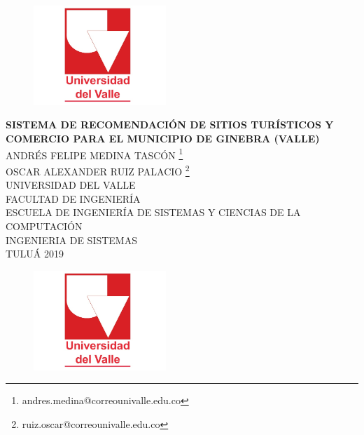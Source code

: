 \documentclass[12pt,letterpaper,openany]{book}
\date{}
\begin{document}
\fancyhead[RO,LE]{}

\begin{titlepage}

\begin{center}

\begin{figure}[htb]
\begin{center}
\includegraphics[width=5cm]{./imagenes/logo}
\end{center}
\end{figure}

\textbf{SISTEMA DE RECOMENDACIÓN DE SITIOS TURÍSTICOS Y COMERCIO PARA EL MUNICIPIO DE GINEBRA (VALLE)} \\

\vspace*{1.5in}
ANDRÉS FELIPE MEDINA TASCÓN \footnote{andres.medina@correounivalle.edu.co}\\
OSCAR ALEXANDER RUIZ PALACIO \footnote{ruiz.oscar@correounivalle.edu.co}\\

\vspace*{1.5in}
UNIVERSIDAD DEL VALLE\\
FACULTAD DE INGENIERÍA\\
ESCUELA DE INGENIERÍA DE SISTEMAS Y CIENCIAS DE LA COMPUTACIÓN\\
INGENIERIA DE SISTEMAS\\
TULUÁ
2019

\end{center}

\vspace*{1.6in}
\begin{center}

\begin{figure}[htb]
\begin{center}
\includegraphics[width=5cm]{./imagenes/logo}
\end{center}
\end{figure}


\end{center}
\end{titlepage}
\end{document}
